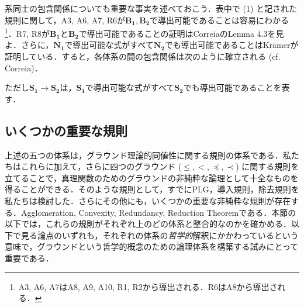 \documentclass[twoside,14Q,dvipdfmx]{jsarticle}
\theoremstyle{definition}
\begin{document}
系同士の包含関係についても重要な事実を述べておこう．表中で (1) と記された規則に関して，A3, A6, A7, R6が$\mathbf{B_{1}}, \mathbf{B_{2}}$で導出可能であることは容易にわかる\footnote{A3, A6, A7はA8, A9, A10, R1, R2から導出される．R6はA8から導出される．}．R7, R8が$\mathbf{B_{1}}$と$\mathbf{B_{2}}$で導出可能であることの証明はCorreia\cite[pp. 113--4]{Correia2016}のLemma 4.3を見よ．さらに，$\mathbf{N_{1}}$で導出可能な式がすべて$\mathbf{N_{2}}$でも導出可能であることはKr\"{a}mer\cite[pp.1681--2]{Kramer2021}が証明している．すると，各体系の間の包含関係は次のように確立される (cf. Correia\cite[\emph{Erratum}]{Correia2020})．
\begin{figure}[htbp]
\centering

\end{figure}

\noindent ただし$\mathbf{S_1}\longrightarrow\mathbf{S_2}$は，$\mathbf{S_1}$で導出可能な式がすべて$\mathbf{S_2}$でも導出可能であることを表す．


\subsection{いくつかの重要な規則}\label{notes}
上述の五つの体系は，グラウンド理論的同値性に関する規則の体系である．私たちはこれらに加えて，さらに四つのグラウンド ($\leq, <, \preceq, \prec$) に関する規則を立てることで，真理関数のためのグラウンドの非純粋な論理として十全なものを得ることができる．そのような規則として，すでに\textsc{PLG}，導入規則，除去規則を私たちは検討した．さらにその他にも，いくつかの重要な非純粋な規則が存在する．Agglomeration, Convexity, Redundancy, Reduction Theoremである．本節の以下では，これらの規則がそれぞれ上のどの体系と整合的なのかを確かめる．以下で見る論点のいずれも，それぞれの体系の\emph{哲学的}解釈にかかわっているという意味で，グラウンドという哲学的概念のための論理体系を構築する試みにとって重要である．
\end{document}
